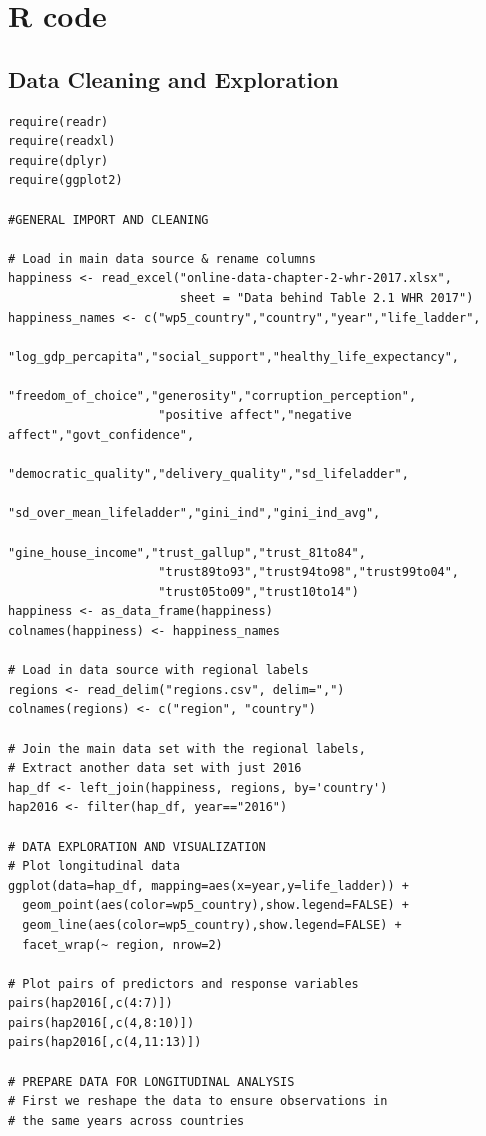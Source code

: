 \documentclass{article}
\begin{document}
\section{R code} \label{sec:adx_Rcode}

\subsection{Data Cleaning and Exploration}
\begin{verbatim}
require(readr)
require(readxl)
require(dplyr)
require(ggplot2)

#GENERAL IMPORT AND CLEANING

# Load in main data source & rename columns
happiness <- read_excel("online-data-chapter-2-whr-2017.xlsx", 
                        sheet = "Data behind Table 2.1 WHR 2017")
happiness_names <- c("wp5_country","country","year","life_ladder",
                     "log_gdp_percapita","social_support","healthy_life_expectancy",
                     "freedom_of_choice","generosity","corruption_perception",
                     "positive affect","negative affect","govt_confidence",
                     "democratic_quality","delivery_quality","sd_lifeladder",
                     "sd_over_mean_lifeladder","gini_ind","gini_ind_avg",
                     "gine_house_income","trust_gallup","trust_81to84",
                     "trust89to93","trust94to98","trust99to04",
                     "trust05to09","trust10to14")
happiness <- as_data_frame(happiness)
colnames(happiness) <- happiness_names

# Load in data source with regional labels
regions <- read_delim("regions.csv", delim=",")
colnames(regions) <- c("region", "country")

# Join the main data set with the regional labels,
# Extract another data set with just 2016
hap_df <- left_join(happiness, regions, by='country')
hap2016 <- filter(hap_df, year=="2016")

# DATA EXPLORATION AND VISUALIZATION
# Plot longitudinal data
ggplot(data=hap_df, mapping=aes(x=year,y=life_ladder)) +
  geom_point(aes(color=wp5_country),show.legend=FALSE) +
  geom_line(aes(color=wp5_country),show.legend=FALSE) +
  facet_wrap(~ region, nrow=2)

# Plot pairs of predictors and response variables
pairs(hap2016[,c(4:7)])
pairs(hap2016[,c(4,8:10)])
pairs(hap2016[,c(4,11:13)])

# PREPARE DATA FOR LONGITUDINAL ANALYSIS
# First we reshape the data to ensure observations in
# the same years across countries


\end{verbatim}
\end{document}
